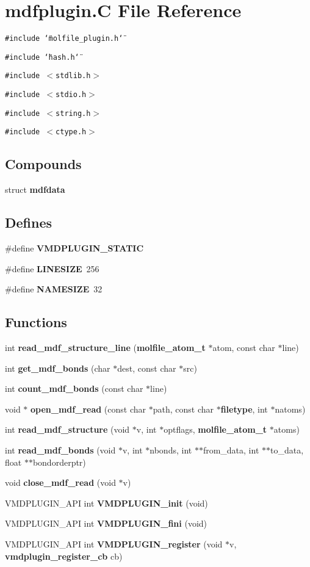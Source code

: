 \section{mdfplugin.C File Reference}
\label{mdfplugin_8C}
{\tt \#include \char`\"{}molfile\_\-plugin.h\char`\"{}}\par
{\tt \#include \char`\"{}hash.h\char`\"{}}\par
{\tt \#include $<$stdlib.h$>$}\par
{\tt \#include $<$stdio.h$>$}\par
{\tt \#include $<$string.h$>$}\par
{\tt \#include $<$ctype.h$>$}\par
\subsection*{Compounds}
\begin{CompactItemize}
\item 
struct {\bf mdfdata}
\end{CompactItemize}
\subsection*{Defines}
\begin{CompactItemize}
\item 
\#define {\bf VMDPLUGIN\_\-STATIC}
\item 
\#define {\bf LINESIZE}\ 256
\item 
\#define {\bf NAMESIZE}\ 32
\end{CompactItemize}
\subsection*{Functions}
\begin{CompactItemize}
\item 
int {\bf read\_\-mdf\_\-structure\_\-line} ({\bf molfile\_\-atom\_\-t} $\ast$atom, const char $\ast$line)
\item 
int {\bf get\_\-mdf\_\-bonds} (char $\ast$dest, const char $\ast$src)
\item 
int {\bf count\_\-mdf\_\-bonds} (const char $\ast$line)
\item 
void $\ast$ {\bf open\_\-mdf\_\-read} (const char $\ast$path, const char $\ast${\bf filetype}, int $\ast$natoms)
\item 
int {\bf read\_\-mdf\_\-structure} (void $\ast$v, int $\ast$optflags, {\bf molfile\_\-atom\_\-t} $\ast$atoms)
\item 
int {\bf read\_\-mdf\_\-bonds} (void $\ast$v, int $\ast$nbonds, int $\ast$$\ast$from\_\-data, int $\ast$$\ast$to\_\-data, float $\ast$$\ast$bondorderptr)
\item 
void {\bf close\_\-mdf\_\-read} (void $\ast$v)
\item 
VMDPLUGIN\_\-API int {\bf VMDPLUGIN\_\-init} (void)
\item 
VMDPLUGIN\_\-API int {\bf VMDPLUGIN\_\-fini} (void)
\item 
VMDPLUGIN\_\-API int {\bf VMDPLUGIN\_\-register} (void $\ast$v, {\bf vmdplugin\_\-register\_\-cb} cb)
\end{CompactItemize}

